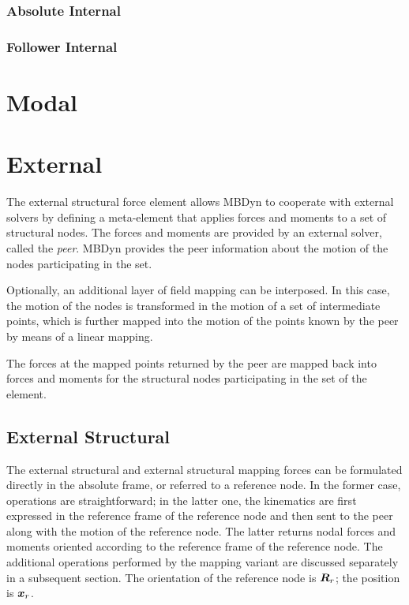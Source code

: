 \subsubsection{Absolute Internal}

\subsubsection{Follower Internal}

\section{Modal}

\section{External}
The external structural force element allows MBDyn
to cooperate with external solvers by defining a meta-element
that applies forces and moments to a set of structural nodes.
The forces and moments are provided by an external solver,
called the \emph{peer}.
MBDyn provides the peer information about the motion of the nodes
participating in the set.

Optionally, an additional layer of field mapping can be interposed.
In this case, the motion of the nodes is transformed in the motion
of a set of intermediate points, which is further mapped
into the motion of the points known by the peer by means
of a linear mapping.

The forces at the mapped points returned by the peer
are mapped back into forces and moments for the structural nodes
participating in the set of the element.

\subsection{External Structural}
The external structural and external structural mapping forces
can be formulated directly in the absolute frame, or referred
to a reference node.
In the former case, operations are straightforward;
in the latter one, the kinematics are first expressed
in the reference frame of the reference node and then sent
to the peer along with the motion of the reference node.
The latter returns nodal forces and moments oriented according
to the reference frame of the reference node.
The additional operations performed by the mapping variant
are discussed separately in a subsequent section.
The orientation of the reference node is $\bm{R}_r$;
the position is $\bm{x}_r$.

